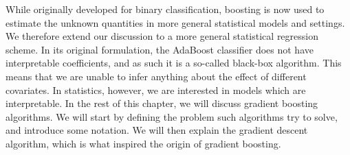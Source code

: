 While originally developed for binary classification, boosting is now used to estimate the unknown quantities in more general statistical models and settings.
We therefore extend our discussion to a more general statistical regression scheme.
In its original formulation, the AdaBoost classifier does not have interpretable coefficients, and as such it is a so-called black-box algorithm.
This means that we are unable to infer anything about the effect of different covariates.
In statistics, however, we are interested in models which are interpretable.
In the rest of this chapter, we will discuss gradient boosting algorithms.
We will start by defining the problem such algorithms try to solve, and introduce some notation.
We will then explain the gradient descent algorithm, which is what inspired the origin of gradient boosting.


